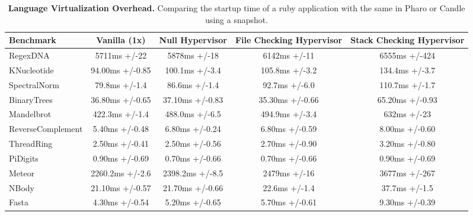 \begin{landscape}
 \begin{table*}[p]
 \small
 	\centering
 	\begin{tabular}{|l|c|c|c|c|}
			\hline
			\textbf{Benchmark}
 			& \textbf{Vanilla \VM (1x)}
			& \textbf{Null Hypervisor}
			& \textbf{File Checking Hypervisor}
			& \textbf{Stack Checking Hypervisor}\\
		\hline
		RegexDNA & 5711ms +/-22 & 5878ms +/-18 & 6142ms +/-11 & 6555ms +/-424 \\\hline
		KNucleotide & 94.00ms +/-0.85 & 100.1ms +/-3.4 & 105.8ms +/-3.2 & 134.4ms +/-3.7 \\\hline
		SpectralNorm & 79.8ms +/-1.4 & 86.6ms +/-1.4 & 92.7ms +/-6.0 & 110.7ms +/-1.7 \\\hline
		BinaryTrees & 36.80ms +/-0.65 & 37.10ms +/-0.83 & 35.30ms +/-0.66 & 65.20ms +/-0.93 \\\hline
		Mandelbrot & 422.3ms +/-1.4 & 488.0ms +/-6.5 & 494.9ms +/-3.4 & 632ms +/-23 \\\hline
		ReverseComplement & 5.40ms +/-0.48 & 6.80ms +/-0.24 & 6.80ms +/-0.59 & 8.00ms +/-0.60 \\\hline
		ThreadRing & 2.50ms +/-0.41 & 2.50ms +/-0.56 & 2.70ms +/-0.90 & 3.20ms +/-0.80 \\\hline
		PiDigits & 0.90ms +/-0.69 & 0.70ms +/-0.66 & 0.70ms +/-0.66 & 0.90ms +/-0.69 \\\hline
		Meteor & 2260.2ms +/-2.6 & 2398.2ms +/-8.5 & 2479ms +/-16 & 3677ms +/-267 \\\hline
		NBody & 21.10ms +/-0.57 & 21.70ms +/-0.66 & 22.6ms +/-1.4 & 37.7ms +/-1.5 \\\hline
		Fasta & 4.30ms +/-0.54 & 5.20ms +/-0.65 & 5.70ms +/-0.61 & 9.30ms +/-0.39 \\\hline
 	\end{tabular}
	\vspace*{0.2cm}
 	\caption{\small\textbf{Language Virtualization Overhead.} Comparing the startup time of a ruby application with the same in Pharo or Candle using a snapshot.\label{tb:benchmarks}}
 \end{table*}
\end{landscape}
